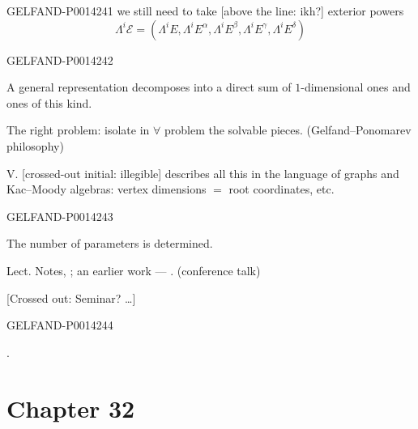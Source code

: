 \begin{GelfandAdjacentEvidence}{GELFAND-P001424}{1}
we still need to take [above the line: ikh?] exterior powers
\[
\Lambda^i\mathcal E=
(\Lambda^i E,\Lambda^i E^\alpha,\Lambda^i E^\beta,
 \Lambda^i E^\gamma,\Lambda^i E^\delta)
\]
\end{GelfandAdjacentEvidence}
\begin{GelfandAdjacentEvidence}{GELFAND-P001424}{2}

A general representation decomposes into a direct sum of \(1\)-dimensional ones and ones of this kind.

The right problem: isolate in \(\forall\) problem the solvable pieces. (Gelfand–Ponomarev philosophy)

V. [crossed-out initial: illegible]  describes all this in the language of graphs and
Kac–Moody algebras:
vertex dimensions \(=\) root coordinates, etc.
\end{GelfandAdjacentEvidence}
\begin{GelfandAdjacentEvidence}{GELFAND-P001424}{3}


The number of parameters is determined.

Lect. Notes, ; an earlier work — .
(conference talk)

[Crossed out: Seminar? \ldots]
\end{GelfandAdjacentEvidence}
\begin{GelfandAdjacentEvidence}{GELFAND-P001424}{4}

\end{GelfandAdjacentEvidence}


\quad {}.



\clearpage{}
\section*{Chapter 32}


